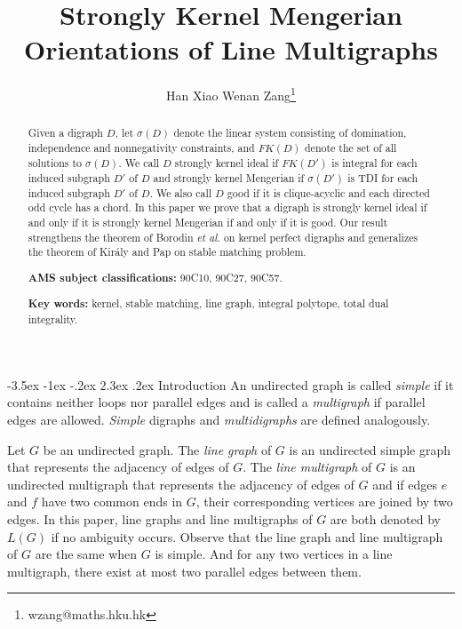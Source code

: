 \documentclass[11pt]{article}
\title{{\Large\bf  Strongly Kernel Mengerian Orientations of Line Multigraphs}}
\date{}
\author{Han Xiao \qquad Wenan Zang\footnote{wzang@maths.hku.hk}}
\affil{Department of Mathematics, 

The University of Hong Kong,

Hong Kong, China
}
\makeatletter
\numberwithin{theorem}{section}
\renewcommand\section{%
  \@startsection{section}{1}
                {\z@}%
                {-3.5ex \@plus -1ex \@minus -.2ex}%
                {2.3ex \@plus.2ex}%
                {\large\bfseries}%
}
\makeatother
\begin{document}

\maketitle

\jot

\hfill

\begin{abstract}
Given a digraph $D$, let $\sigma(D)$ denote the linear system consisting of domination, independence and nonnegativity constraints, and $FK(D)$ denote the set of all solutions to $\sigma(D)$. We call $D$ strongly kernel ideal if $FK(D')$ is integral for each induced subgraph $D'$ of $D$ and strongly kernel Mengerian if $\sigma(D')$ is TDI for each induced subgraph $D'$ of $D$. We also call $D$ good if it is clique-acyclic and each directed odd cycle has a chord.
In this paper we prove that a digraph is strongly kernel ideal if and only if it is strongly kernel Mengerian if and only if it is good. Our result strengthens the theorem of Borodin \textit{et al.} \cite{BoroKost98} on kernel perfect digraphs and generalizes the theorem of Kir\'{a}ly and Pap \cite{KiraPap08} on stable matching problem.

\hfill

\hfill

\noindent\textbf{AMS subject classifications:} 90C10, 90C27, 90C57.


\noindent\textbf{Key words:} kernel, stable matching, line graph, integral polytope, total dual integrality.
\end{abstract}


\newpage
\section{Introduction}
\label{intro}
An undirected graph is called \textit{simple} if it contains neither loops nor parallel edges and is called a \textit{multigraph} if parallel edges are allowed. 
\textit{Simple} digraphs and \textit{multidigraphs} are defined analogously. 

Let $G$ be an undirected graph.
The \textit{line graph} of $G$ is an undirected simple graph that represents the adjacency of edges of $G$. The \textit{line multigraph} of $G$ is an undirected multigraph that represents the adjacency of edges of $G$ and if edges $e$ and $f$ have two common ends in $G$, their corresponding vertices are joined by two edges. In this paper, line graphs and line multigraphs of $G$ are both denoted by $L(G)$ if no ambiguity occurs. Observe that the line graph and line multigraph of $G$ are the same when $G$ is simple. And for any two vertices in a line multigraph, there exist at most two parallel edges between them.
\end{document}
